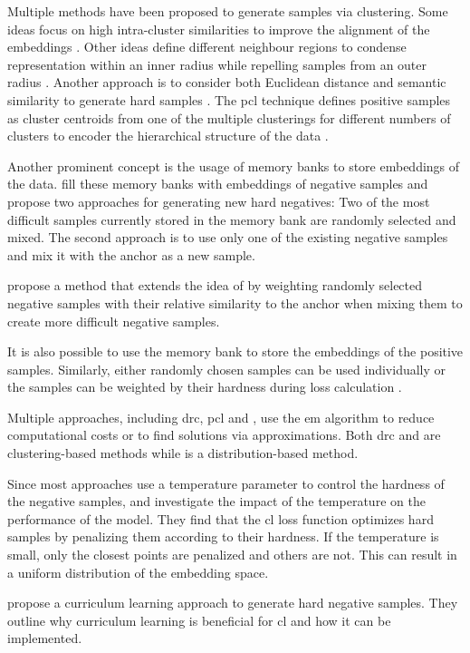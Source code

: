Multiple methods have been proposed to generate samples via clustering.
Some ideas focus on high intra-cluster similarities to improve the alignment of the embeddings \citet{DRC_2020}.
Other ideas define different neighbour regions to condense representation within an inner radius 
while repelling samples from an outer radius \citet{local_aggr_2019}.
Another approach is to consider both Euclidean distance and semantic similarity to generate hard samples \citet{mining_manifolds_2018}.
The \ac{pcl} technique defines positive samples as cluster centroids 
from one of the multiple clusterings for different numbers of clusters 
to encoder the hierarchical structure of the data \citet{PCL_2021}.


Another prominent concept is the usage of memory banks to store embeddings of the data.
\citeauthor{mochi_2020} fill these memory banks with embeddings of negative samples 
and propose two approaches for generating new hard negatives: 
Two of the most difficult samples currently stored in the memory bank are randomly selected and mixed.
The second approach is to use only one of the existing negative samples and mix it with the anchor as a new sample.

\citet{progcl_2022} propose a method that extends the idea of \citet{mochi_2020} by weighting randomly selected negative samples 
with their relative similarity to the anchor when mixing them to create more difficult negative samples.

It is also possible to use the memory bank to store the embeddings of the positive samples.
Similarly, either randomly chosen samples can be used individually or 
the samples can be weighted by their hardness during loss calculation \citet{mining_potential_2024}.


Multiple approaches, including \ac{drc}, \ac{pcl} and \progcl{}, use the \ac{em} algorithm 
to reduce computational costs or to find solutions via approximations.
Both \ac{drc} \citet{DRC_2020} and \progcl{} \citet{PCL_2021} are clustering-based methods 
while \progcl{} \citet{progcl_2022} is a distribution-based method.

Since most approaches use a temperature parameter to control the hardness of the negative samples, 
\citet{CL_temp_2021} and \citet{grape_2024} investigate the impact of the temperature on the performance of the model.
They find that the \ac{cl} loss function optimizes hard samples by penalizing them according to their hardness.
If the temperature is small, only the closest points are penalized and others are not.
This can result in a uniform distribution of the embedding space.

\citet{curricular_weighting_2024} propose a curriculum learning approach to generate hard negative samples.
They outline why curriculum learning is beneficial for \ac{cl} and how it can be implemented.

